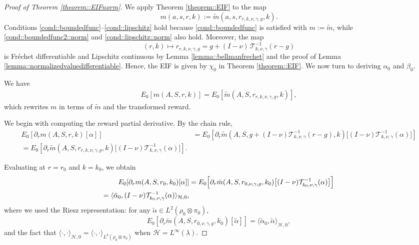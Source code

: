 \documentclass[11pt]{article}
\theoremstyle{plain}
\begin{document}
\begin{proof}[Proof of Theorem \ref{theorem::EIFnorm}]
We apply Theorem \ref{theorem::EIF} to the map
\[
m(a,s,r,k) := \tilde m(a,s,r_{r,k,\nu,\gamma,g},k).
\]
Conditions \ref{cond::boundedfunc}--\ref{cond::lipschitz} hold because
\ref{cond::boundedfunc} is satisfied with $m := \tilde{m}$, while
\ref{cond::boundedfunc2::norm} and \ref{cond::lipschitz::norm} also hold.
Moreover, the map
\[
(r,k) \mapsto r_{r,k,\nu,\gamma,g} = g + (I - \nu)\,\mathcal{T}_{k,\nu,\gamma}^{-1}(r-g)
\]  
is Fréchet differentiable and Lipschitz continuous by
Lemma \ref{lemma::bellmanfrechet} and the proof of
Lemma \ref{lemma::normalizedvaluedifferentiable}. Hence, the EIF is given by
$\chi_0$ in Theorem \ref{theorem::EIF}. We now turn to deriving $\alpha_0$ and
$\beta_0$.


 

We have
\begin{align}
E_0[m(A, S, r, k)] 
= E_0[\tilde{m}(A,S, r_{r,k,\nu,\gamma,g}, k)],
\label{eq:step1}
\end{align}
which rewrites $m$ in terms of $\tilde{m}$ and the transformed reward.  

We begin with computing the reward partial derivative. By the chain rule,
\begin{align*}
E_0[\partial_r m(A, S, r, k)[\alpha]] 
&= E_0\!\left[\partial_r \tilde{m}(A,S, g + (I - \nu)\mathcal{T}_{k, \nu,\gamma}^{-1}(r-g), k)
  \bigl[(I - \nu)\mathcal{T}_{k, \nu,\gamma}^{-1}(\alpha)\bigr]\right] \\
= E_0\!\left[\partial_r \tilde{m}(A,S, r_{r, k, \nu, \gamma,g}, k)
  \bigl[(I - \nu)\mathcal{T}_{k, \nu,\gamma}^{-1}(\alpha)\bigr]\right].
\end{align*}

Evaluating at $r = r_0$ and $k = k_0$, we obtain
\begin{align}
E_0[\partial_r m(A, S, r_0, k_0)[\alpha]] 
&= E_0\!\left[\partial_r \tilde{m}(A,S, r_{0,\nu,\gamma,g}, k_0)
  \bigl[(I - \nu)\mathcal{T}_{k_0, \nu,\gamma}^{-1}(\alpha)\bigr]\right] \notag \\
= \langle \tilde{\alpha}_0, (I - \nu)\mathcal{T}_{k_0, \nu,\gamma}^{-1}(\alpha) \rangle_{\mathcal{H}, 0} ,
\label{eq:step2}
\end{align}
where we used the Riesz representation: for any $\tilde \alpha \in L^2(\rho_0 \otimes \pi_0)$,
\[
E_0\!\left[\partial_r \tilde{m}(A,S, r_{0,\nu,\gamma,g}, k_0)[\tilde \alpha]\right] 
= \langle \tilde{\alpha}_0, \tilde \alpha \rangle_{\mathcal{H}, 0},
\]
and the fact that $\langle \cdot, \cdot \rangle_{\mathcal{H}, 0} = \langle \cdot, \cdot \rangle_{L^2(\rho_0 \otimes \pi_0)}$ when $\mathcal{H} = L^\infty(\lambda)$.  


\end{proof}
\end{document}
